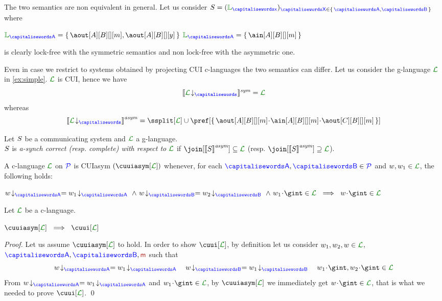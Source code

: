 \begin{example}
\label{ex:simple2}
The two semantics are non equivalent in general.
Let us consider $\aCS = ({\alang}_{\px})_{\ptp[X] \in \Set{\p,\q}}$ where\\
\centerline{$\alang_{\p}= \Set{\aout[A][B][][m], \aout[A][B][][y]}$ \qquad $\alang_{\p}= \Set{\ain[A][B][][m]}$ }
is clearly lock-free with the symmetric semantics and non lock-free with the asymmetric one.

 Even in case we restrict to systems
obtained by projecting CUI c-languages the two semantics can differ.
Let us consider the g-language $\clang$ in \cref{ex:simple}.
$\clang$ is CUI, hence we have 
  $$\ssem{\proj{\clang}{}} = \clang$$ 
whereas 
  $$\asem{\proj{\clang}{}} = \ssplit[\clang] \cup \pref[\Set{\aout[A][B][][m]\cat\ain[A][B][][m]\cat\aout[C][B][][m]}]$$
\finex
\end{example} 

\begin{definition}\label{def:cc}
  Let $S$ be a communicating system and $\clang$ a g-language.\\
  $S$ is \emph{a-synch correct (resp. complete) with respect to
    $\clang$} if $\join[{\asem{\aCS}}]\subseteq \clang$ (resp. 
  $\join[{\asem{\aCS}}]\supseteq \clang$).
\end{definition}


\begin{definition}[CUIasym]
\label{def:cuiasym}
A c-language $\clang$ on $\mathcal{\color{blue}{P}}$ is CUIasym $(\cuuiasym[\clang])$ whenever,
 for each $\p,\q\in\ptpset$ and $\acword, \acword_1\in\clang$, the following holds:\\
 \centerline{$\proj{\acword}{A} = \proj{\acword_1}{A}\ \land\  \proj{\acword}{B} = \proj{\acword_2}{B}\ \land\  \acword_1\cat\gint\in\clang\ \implies\ \acword\cat\gint\in\clang$}
\end{definition}

\begin{proposition}
Let $\clang$ be a c-language.\\
\centerline{$\cuuiasym[{\clang}]\ \implies\ \cuui[\clang]$}
\end{proposition}
\begin{proof}
Let us assume $\cuuiasym[{\clang}]$ to hold. In order to show  $\cuui[{\clang}]$, 
by definition let us consider $\acword_1,\acword_2,\acword\in\clang$, $\p,\q,\msg$ such that
$$\proj{\acword}{A} =\proj{\acword_1}{A}\quad \proj{\acword}{B} =\proj{\acword_1}{B}
\quad \acword_1\cat\gint, \acword_2\cat\gint\in\clang$$
From $\proj{\acword}{A} =\proj{\acword_1}{A}$ and $\acword_1\cat\gint\in\clang$,
by $\cuuiasym[{\clang}]$ we immediately get  $\acword\cat\gint\in\clang$, that is what we needed to
prove $\cuui[\clang]$.
\qed
\end{proof}


